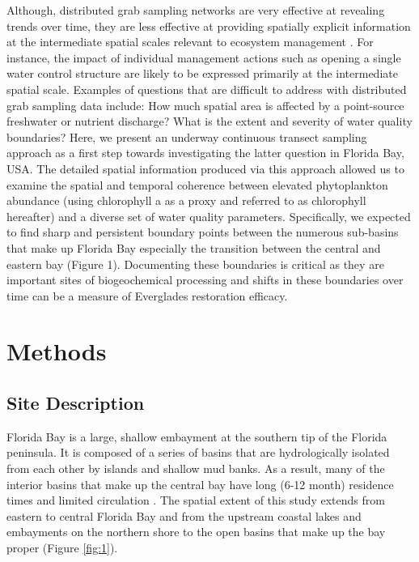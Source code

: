 Although, distributed grab sampling networks are very effective at revealing trends over time, they are less effective at providing spatially explicit information at the intermediate spatial scales relevant to ecosystem management \citep{anttila2008feasible}. For instance, the impact of individual management actions such as opening a single water control structure are likely to be expressed primarily at the intermediate spatial scale. Examples of questions that are difficult to address with distributed grab sampling data include: How much spatial area is affected by a point-source freshwater or nutrient discharge? What is the extent and severity of water quality boundaries? Here, we present an underway continuous transect sampling approach as a first step towards investigating the latter question in Florida Bay, USA. The detailed spatial information produced via this approach allowed us to examine the spatial and temporal coherence between elevated phytoplankton abundance (using chlorophyll a as a proxy and referred to as chlorophyll hereafter) and a diverse set of water quality parameters. Specifically, we expected to find sharp and persistent boundary points between the numerous sub-basins that make up Florida Bay especially the transition between the central and eastern bay (Figure 1). Documenting these boundaries is critical as they are important sites of biogeochemical processing and shifts in these boundaries over time can be a measure of Everglades restoration efficacy.
\section{Methods}
\label{methods}
\subsection{Site Description}
\label{sitedescription}
Florida Bay is a large, shallow embayment at the southern tip of the Florida peninsula. It is composed of a series of basins that are hydrologically isolated from each other by islands and shallow mud banks. As a result, many of the interior basins that make up the central bay have long (6-12 month) residence times and limited circulation \citep{lee2016circulation}. The spatial extent of this study extends from eastern to central Florida Bay and from the upstream coastal lakes and embayments on the northern shore to the open basins that make up the bay proper (Figure \ref{fig:1}). 

